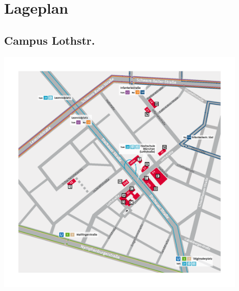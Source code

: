 \section{Lageplan}

\subsection{Campus Lothstr.}
\includegraphics[width=12cm]{inputs/Lageplan/lothstr.png}

